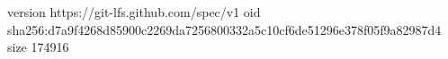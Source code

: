 version https://git-lfs.github.com/spec/v1
oid sha256:d7a9f4268d85900c2269da7256800332a5c10cf6de51296e378f05f9a82987d4
size 174916
